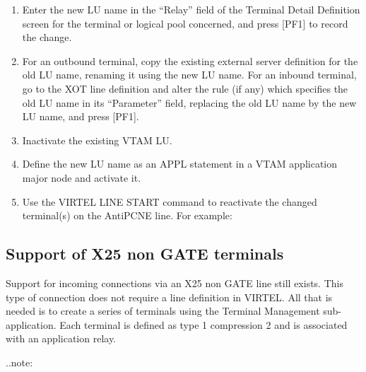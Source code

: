 \documentclass[letterpaper,10pt,english]{sphinxmanual}
\begin{document}
\begin{enumerate}
\item {} 
Enter the new LU name in the “Relay” field of the Terminal Detail Definition screen for the terminal or logical pool concerned, and press {[}PF1{]} to record the change.

\item {} 
For an outbound terminal, copy the existing external server definition for the old LU name, renaming it using the new LU name. For an inbound terminal, go to the XOT line definition and alter the rule (if any) which specifies the old LU name in its “Parameter” field, replacing the old LU name by the new LU name, and press {[}PF1{]}.

\item {} 
Inactivate the existing VTAM LU.

\item {} 
Define the new LU name as an APPL statement in a VTAM application major node and activate it.

\item {} 
Use the VIRTEL LINE START command to reactivate the changed terminal(s) on the AntiPCNE line. For example: 

\end{enumerate}


\subsection{Support of X25 non GATE terminals}
\label{\detokenize{connectivity_guide:support-of-x25-non-gate-terminals}}\label{\detokenize{connectivity_guide:index-87}}
Support for incoming connections via an X25 non GATE line still exists. This type of connection does not require a line definition in VIRTEL. All that is needed is to create a series of terminals using the Terminal Management sub- application. Each terminal is defined as type 1 compression 2 and is associated with an application relay.

..note:

\begin{sphinxVerbatim}[commandchars=\\\{\}]
           
\end{sphinxVerbatim}
\end{document}
